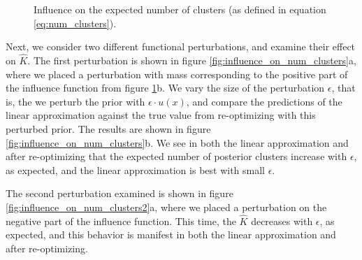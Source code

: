 \documentclass[a4paper]{article}
\begin{document}
\begin{figure}[h!]
\begin{subfigure}[t]{0.5\textwidth}
	\end{subfigure}
	\caption{Influence on the expected number of clusters (as defined in equation \ref{eq:num_clusters}). }
	\label{fig:influence_fun_on_num_clusters}
\end{figure}


Next, we consider two different functional perturbations, and examine their effect
on $\hat K$. The first perturbation is shown in
figure \ref{fig:influence_on_num_clusters}a,
where we placed a perturbation with mass corresponding to the positive part
of the influence function from figure \ref{fig:influence_fun_on_num_clusters}b. We
vary the size of the perturbation $\epsilon$, that is, the we perturb the prior with
$\epsilon \cdot u(x)$, and compare the predictions of the linear approximation against
the true value from re-optimizing with this perturbed prior. The results are shown in figure
\ref{fig:influence_on_num_clusters}b. We see in both the linear approximation and
after re-optimizing that the expected number of posterior clusters increase with $\epsilon$, as
expected, and the linear approximation is best with small $\epsilon$.

The second perturbation examined is shown in figure \ref{fig:influence_on_num_clusters2}a,
where we placed a perturbation on the negative part of the influence function. This time,
the $\hat K$ decreases with $\epsilon$, as expected, and
this behavior is manifest in both the linear approximation and after re-optimizing.
\end{document}
